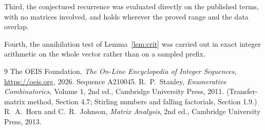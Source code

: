 \documentclass[11pt,a4paper]{article}
\theoremstyle{plain}
\theoremstyle{definition}
\begin{document}
Third, the conjectured recurrence was evaluated directly on the published terms, with no
matrices involved, and holds wherever the proved range and the data overlap.

Fourth, the annihilation test of Lemma~\ref{lem:crit} was carried out in exact integer
arithmetic on the whole vector rather than on a sampled prefix.

\begin{thebibliography}{9}
 The OEIS Foundation, \emph{The On-Line Encyclopedia of Integer
Sequences}, \url{https://oeis.org}, 2026. Sequence A210045.
 R.~P.~Stanley, \emph{Enumerative Combinatorics}, Volume 1, 2nd ed.,
Cambridge University Press, 2011. (Transfer-matrix method, Section 4.7; Stirling numbers and
falling factorials, Section 1.9.)
 R.~A.~Horn and C.~R.~Johnson, \emph{Matrix Analysis}, 2nd ed., Cambridge
University Press, 2013.
\end{thebibliography}
\end{document}
